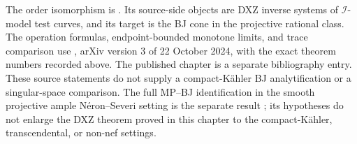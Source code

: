 \begin{samepage}
\begin{remark}
\label{rem:comp-primary-source-boundary}
The order isomorphism is \cite[Theorem~3.14]{DXZ23}.  Its source-side
objects are DXZ inverse systems of $\mathcal I$-model test curves, and
its target is the BJ cone in the projective rational class.  The operation
formulas, endpoint-bounded monotone limits, and trace comparison use
\cite{XiaOperationsV3}, arXiv version 3 of 22 October 2024, with the
exact theorem numbers recorded above. The published chapter
\cite{Xia23Operations} is a separate bibliography entry.  These source statements do not supply a compact-K\"ahler BJ
analytification or a singular-space comparison.  The full MP--BJ
identification in the smooth projective ample N\'eron--Severi setting is the
separate result ; its hypotheses do
not enlarge the DXZ theorem proved in this chapter to the compact-K\"ahler,
transcendental, or non-nef settings.
\end{remark}
\end{samepage}
